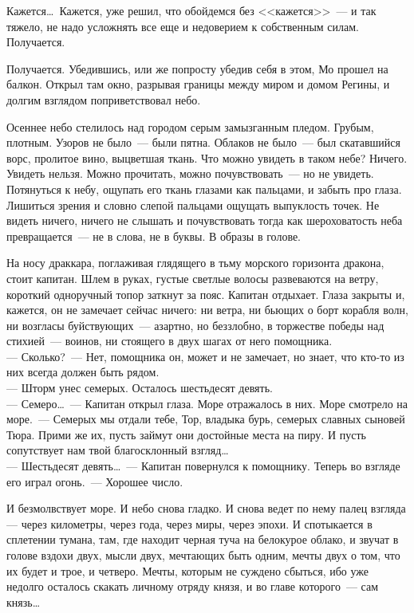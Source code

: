 Кажется\ldots\ Кажется, уже решил, что обойдемся без <<кажется>>~--- и так 
тяжело, не 
надо усложнять все еще и недоверием к собственным силам. Получается.

Получается. Убедившись, или же попросту убедив себя в этом, Мо прошел на 
балкон. 
Открыл там окно, разрывая границы между миром и домом Регины, и долгим взглядом 
поприветствовал небо.

Осеннее небо стелилось над городом серым замызганным пледом. Грубым, плотным. 
Узоров не было~--- были пятна. Облаков не было~--- был скатавшийся ворс, 
пролитое 
вино, выцветшая ткань. Что можно увидеть в таком небе? Ничего. Увидеть нельзя. 
Можно прочитать, можно почувствовать~--- но не увидеть. Потянуться к небу, 
ощупать 
его ткань глазами как пальцами, и забыть про глаза. Лишиться зрения и словно 
слепой пальцами ощущать выпуклость точек. Не видеть ничего, ничего не слышать и 
почувствовать тогда как шероховатость неба превращается~--- не в слова, не в 
буквы. В образы в голове.

На носу драккара, поглаживая глядящего в тьму морского горизонта дракона, стоит 
капитан. Шлем в руках, густые светлые волосы развеваются на ветру, короткий 
одноручный топор заткнут за пояс. Капитан отдыхает. Глаза закрыты и, кажется, 
он 
не замечает сейчас ничего: ни ветра, ни бьющих о борт корабля волн, ни возгласы 
буйствующих~--- азартно, но беззлобно, в торжестве победы над стихией~--- 
воинов, ни 
стоящего в двух шагах от него помощника.\\
--- Сколько?~--- Нет, помощника он, может и не замечает, но знает, что кто-то 
из них 
всегда должен быть рядом.\\
--- Шторм унес семерых. Осталось шестьдесят девять.\\
--- Семеро\ldots~--- Капитан открыл глаза. Море отражалось в них. Море смотрело 
на 
море.~--- Семерых мы отдали тебе, Тор, владыка бурь, семерых славных сыновей 
Тюра. 
Прими же их, пусть займут они достойные места на пиру. И пусть сопутствует нам 
твой благосклонный взгляд\ldots\\
--- Шестьдесят девять\ldots~--- Капитан повернулся к помощнику. Теперь во 
взгляде его 
играл огонь.~--- Хорошее число.

И безмолвствует море. И небо снова гладко. И снова ведет по нему палец взгляда 
--- через километры, через года, через миры, через эпохи. И спотыкается в 
сплетении 
тумана, там, где находит черная туча на белокурое облако, и звучат в голове 
вздохи двух, мысли двух, мечтающих быть одним, мечты двух о том, что их будет и 
трое, и четверо. Мечты, которым не суждено сбыться, ибо уже недолго осталось 
скакать личному отряду князя, и во главе которого~--- сам князь\ldots

